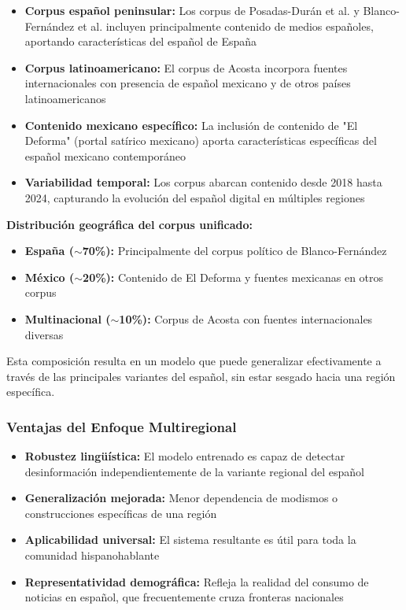 \begin{itemize}
    \item \textbf{Corpus español peninsular:} Los corpus de Posadas-Durán et al. \cite{posadas2019detection} y Blanco-Fernández et al. \cite{blanco2024enhancing} incluyen principalmente contenido de medios españoles, aportando características del español de España
    
    \item \textbf{Corpus latinoamericano:} El corpus de Acosta \cite{acosta2019construccion} incorpora fuentes internacionales con presencia de español mexicano y de otros países latinoamericanos
    
    \item \textbf{Contenido mexicano específico:} La inclusión de contenido de "El Deforma" (portal satírico mexicano) aporta características específicas del español mexicano contemporáneo
    
    \item \textbf{Variabilidad temporal:} Los corpus abarcan contenido desde 2018 hasta 2024, capturando la evolución del español digital en múltiples regiones
\end{itemize}

\textbf{Distribución geográfica del corpus unificado:}
\begin{itemize}
    \item \textbf{España ($\sim$70\%):} Principalmente del corpus político de Blanco-Fernández
    \item \textbf{México ($\sim$20\%):} Contenido de El Deforma y fuentes mexicanas en otros corpus
    \item \textbf{Multinacional ($\sim$10\%):} Corpus de Acosta con fuentes internacionales diversas
\end{itemize}

Esta composición resulta en un modelo que puede generalizar efectivamente a través de las principales variantes del español, sin estar sesgado hacia una región específica.

\subsubsection{Ventajas del Enfoque Multiregional}

\begin{itemize}
    \item \textbf{Robustez lingüística:} El modelo entrenado es capaz de detectar desinformación independientemente de la variante regional del español
    \item \textbf{Generalización mejorada:} Menor dependencia de modismos o construcciones específicas de una región
    \item \textbf{Aplicabilidad universal:} El sistema resultante es útil para toda la comunidad hispanohablante
    \item \textbf{Representatividad demográfica:} Refleja la realidad del consumo de noticias en español, que frecuentemente cruza fronteras nacionales
\end{itemize}

